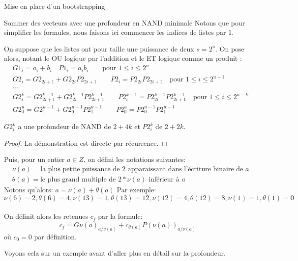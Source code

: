 \begin{section}{Mise en place d'un bootstrapping}
\begin{subsection}{Sommer des vecteurs avec une profondeur en NAND minimale}
Notons que pour simplifier les formules, nous faisons ici commencer les indices de listes par 1.

On suppose que les listes ont pour taille une puissance de deux $s = 2^u$. On pose alors, notant le OU logique par l'addition et le ET logique comme un produit :
\begin{align*}
&{G1}_i = a_i +  b_i\quad {P1}_i = a_i b_i \qquad \text{pour $1 \leq i
\leq 2^u$}\\
&{G2}_i = {G2}_{2i + 1} + {G2}_{2i}{P2}_{2i + 1}\qquad {P2}_i = {P2}_{2i}
{P2}_{2i + 1} \quad \text{pour $1 \leq i \leq 2^{u-1}$}\\
&\cdots \\
&{G2^k_i} = {G2^{k-1}_{2i + 1}} + {G2^{k-1}_{2i}}{P2^{k-1}_{2i + 1}}\qquad
{P2^{k-1}_i} = {P2^{k-1}_{2i}} {P2^{k-1}_{2i + 1}} \quad \text{pour $1 \leq i
\leq 2^{u-k}$}\\
&{G2^u_0} = {G2^{u-1}_{1}} + {G2^{u-1}_{0}}{P2^{u-1}_{1}}\qquad
{P2^{u}_0} = {P2^{u-1}_{0}} {P2^{u-1}_{1}} 
\end{align*}
\begin{prop} \label{g_et_p}
$G2^k_i$ a une profondeur de NAND de $2 + 4k$ et $P2^k_i$ de $2 + 2k$.
\end{prop}
\begin{proof}
La démonstration est directe par récurrence. 
\end{proof}

Puis, pour un entier $a \in Z$, on défini les notations suivantes:
\begin{align*}
&\nu(a) = \text{la plus petite puissance de $2$ apparaissant dans l'écriture
binaire de $a$}\\
&\theta(a) = \text{le plus grand multiple de $2*\nu(a)$ inférieur à $a$}
\end{align*}
Notons qu'alors: $a = \nu(a) + \theta(a)$
Par exemple: 
\[\nu(6) = 2, \theta(6) = 4, \nu(13) = 1, \theta(13) = 12, \nu(12)
= 4, \theta(12) = 8, \nu(1) = 1, \theta(1) = 0\]
\paragraph{}
On définit alors les retenues $c_j$ par la formule:
\[c_j = {G\nu(a)}_{a/\nu(a)} + c_{\theta(a)} {P(\nu(a))}_{a/\nu(a)}\]
où $c_0 = 0$ par définition.

Voyons cela sur un exemple avant d'aller plus en détail sur la profondeur.


\end{subsection}
\end{section}

